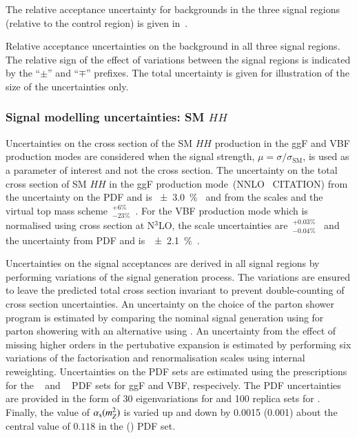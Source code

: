 The relative acceptance uncertainty for \ttbar backgrounds in the
three signal regions (relative to the \ZHF control region) is given
in~.

\begin{table}[htbp]
  \centering

  

  \caption{Relative acceptance uncertainties on the \ttbar background
    in all three signal regions. The relative sign of the effect of
    variations between the signal regions is indicated by the
    ``$\pm$'' and ``$\mp$'' prefixes. The total uncertainty is given
    for illustration of the size of the uncertainties only.}
  \label{tab:uncertainties_ttbar_extrapol}
\end{table}



\subsubsection{Signal modelling uncertainties: SM $HH$}

Uncertainties on the cross section of the SM $HH$ production in the
ggF and VBF production modes are considered when the signal strength,
$\mu = \sigma / \sigma_{\text{SM}}$, is used as a parameter of
interest and not the cross section. The uncertainty on the total cross
section of SM $HH$ in the ggF production mode~(NNLO
\FTapprox~CITATION) from the uncertainty on the PDF and \alphas is
\SI{\pm 3.0}{\percent}~\cite{LHCHWGHH} and from the scales and the
virtual top mass scheme~$^{+6\%}_{-23\%}$~\cite{Baglio:2020wgt}. For
the VBF production mode which is normalised using cross section at
N$^3$LO, the scale uncertainties
are~$^{+0.03\%}_{-0.04\%}$~\cite{LHCHWGHH} and the uncertainty from
PDF and \alphas is~\SI{\pm 2.1}{\percent}~\cite{LHCHWGHH}.

Uncertainties on the signal acceptances are derived in all signal
regions by performing variations of the signal generation process. The
variations are ensured to leave the predicted total cross section
invariant to prevent double-counting of cross section
uncertainties. An uncertainty on the choice of the parton shower
program is estimated by comparing the nominal signal generation using
\PYTHIA[8.244] for parton showering with an alternative using
\HERWIG[7.1.6]. An uncertainty from the effect of missing higher
orders in the pertubative expansion is estimated by performing six
variations of the factorisation and renormalisation scales using
internal reweighting. Uncertainties on the PDF sets are estimated
using the prescriptions for the
\PDFforLHC[15nlo]~\cite{Butterworth:2015oua} and
\NNPDF[3.0nlo]~\cite{Ball:2014uwa} PDF sets for ggF and VBF,
respecively. The PDF uncertainties are provided in the form of 30
eigenvariations for \PDFforLHC[15nlo] and 100 replica sets for
\NNPDF[3.0nlo]. Finally, the value of $\alpha_{\text{s}}(m_{Z}^2)$ is varied up
and down by 0.0015 (0.001) about the central value of $0.118$ in the
\PDFforLHC[15nlo] (\NNPDF[3.0nlo]) PDF set.

